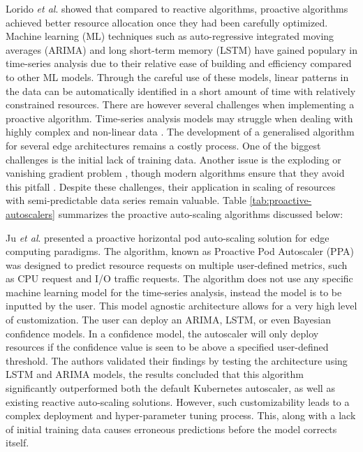 Lorido \textit{et al}. \cite{lorido2014review} showed that compared to reactive algorithms, proactive algorithms achieved better resource allocation once they had been carefully optimized. Machine learning (ML) techniques such as auto-regressive integrated moving averages (ARIMA) and long short-term memory (LSTM) have gained populary in time-series analysis due to their relative ease of building and efficiency compared to other ML models. Through the careful use of these models, linear patterns in the data can be automatically identified in a short amount of time with relatively constrained resources. There are however several challenges when implementing a proactive algorithm. Time-series analysis models may struggle when dealing with highly complex and non-linear data \cite{dogani2023auto}. The development of a generalised algorithm for several edge architectures remains a costly process. One of the biggest challenges is the initial lack of training data. Another issue is the exploding or vanishing gradient problem \cite{pascanu2013difficulty}, though modern algorithms ensure that they avoid this pitfall \cite{hochreiter2001gradient}. Despite these challenges, their application in scaling of resources with semi-predictable data series remain valuable. Table \ref{tab:proactive-autoscalers} summarizes the proactive auto-scaling algorithms discussed below:\par

Ju \textit{et al}. \cite{ju2021proactive} presented a proactive horizontal pod auto-scaling solution for edge computing paradigms. The algorithm, known as Proactive Pod Autoscaler (PPA) was designed to predict resource requests on multiple user-defined metrics, such as CPU request and I/O traffic requests. The algorithm does not use any specific machine learning model for the time-series analysis, instead the model is to be inputted by the user. This model agnostic architecture allows for a very high level of customization. The user can deploy an ARIMA, LSTM, or even Bayesian confidence models. In a confidence model, the autoscaler will only deploy resources if the confidence value is seen to be above a specified user-defined threshold. The authors validated their findings by testing the architecture using LSTM and ARIMA models, the results concluded that this algorithm significantly outperformed both the default Kubernetes autoscaler, as well as existing reactive auto-scaling solutions. However, such customizability leads to a complex deployment and hyper-parameter tuning process. This, along with a lack of initial training data causes erroneous predictions before the model corrects itself.\par


